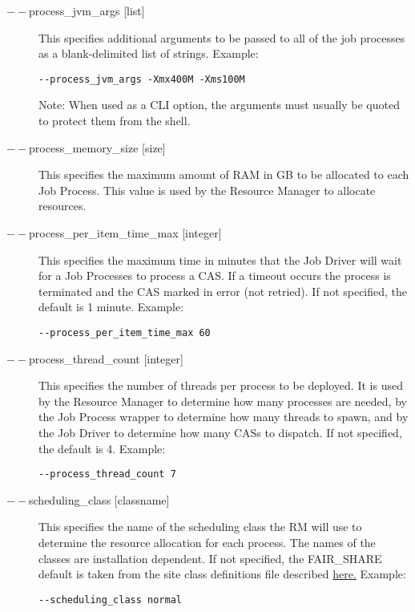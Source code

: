 \begin{description}
           \item[$--$process\_jvm\_args {[list]} ] This specifies additional arguments to be passed to
             all of the job processes as a blank-delimited list of strings. Example:
             \begin{verbatim}
--process_jvm_args -Xmx400M -Xms100M
             \end{verbatim}

             Note: When used as a CLI option, the arguments must usually be
             quoted to protect them from the shell.
                          
           \item[$--$process\_memory\_size {[size]} ] This specifies the maximum amount of RAM in GB
             to be allocated to each Job Process.  This value is used by the Resource Manager to
             allocate resources.

           \item[$--$process\_per\_item\_time\_max {[integer]} ] This specifies the maximum time in
             minutes that the Job Driver will wait for a Job Processes to process a CAS. If a
             timeout occurs the process is terminated and the CAS marked in error (not retried). If
             not specified, the default is 1 minute. Example:
             \begin{verbatim}
--process_per_item_time_max 60 
             \end{verbatim}
             
           \item[$--$process\_thread\_count {[integer]} ] This specifies the number of threads per
             process to be deployed. It is used by the Resource Manager to determine how many
             processes are needed, by the Job Process wrapper to determine how many threads to
             spawn, and by the Job Driver to determine how many CASs to dispatch. If not specified,
             the default is 4. Example:
             \begin{verbatim}
--process_thread_count 7 
             \end{verbatim}
             
           \item[$--$scheduling\_class {[classname]} ] This specifies the name of the scheduling class
             the RM will use to determine the resource allocation for each process. The names of the
             classes are installation dependent. 
             If not specified, the FAIR\_SHARE default is taken from the site class definitions file
             described \hyperref[subsubsec:class.configuration]{here.} 
             Example:
             \begin{verbatim}
--scheduling_class normal 
             \end{verbatim}


\end{description}
